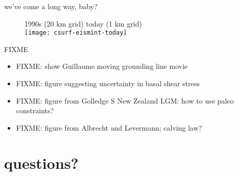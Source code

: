 \documentclass[hide notes,intlimits]{beamer}
\begin{document}
\begin{frame}{we've come a long way, baby?}
  \vspace{-.25cm}
  \begin{figure}
    1990s (20 km grid) \hspace{1.75cm} today (1 km grid)\\
    \texttt{[image: csurf-eismint-today]}
  \end{figure}
\end{frame}



\begin{frame}{FIXME}

\begin{itemize}
\item FIXME:  show Guillaume moving grounding line movie
\item FIXME:  figure suggesting uncertainty in basal shear stress
\item FIXME:  figure from Golledge S New Zealand LGM: how to use paleo constraints?
\item FIXME:  figure from Albrecht and Levermann; calving law?
\end{itemize}
\end{frame}

\section{questions?}
\end{document}
